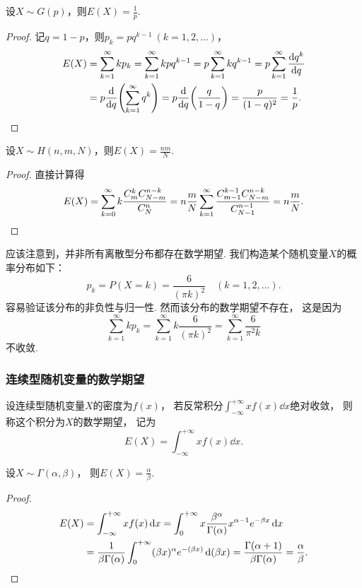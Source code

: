 \begin{theorem}\label{theorem:随机变量的数字特征.几何分布的数学期望}
设\(X \sim G(p)\)，则\(E(X) = \frac{1}{p}\).
\begin{proof}
记\(q = 1-p\)，则\(p_k = pq^{k-1}\ (k=1,2,\dotsc)\)，
\begin{align*}
	E(X)
	&= \sum\limits_{k=1}^\infty k p_k
	= \sum\limits_{k=1}^\infty k p q^{k-1}
	= p \sum\limits_{k=1}^\infty k q^{k-1}
	= p \sum\limits_{k=1}^\infty \dv{q^k}{q} \\
	&= p \dv{q}(\sum\limits_{k=1}^\infty q^k)
	= p \dv{q}(\frac{q}{1-q})
	= \frac{p}{(1-q)^2}
	= \frac{1}{p}.
	\qedhere
\end{align*}
\end{proof}
\end{theorem}

\begin{theorem}
设\(X \sim H(n,m,N)\)，则\(E(X) = \frac{n m}{N}\).
\begin{proof}
直接计算得\[
	E(X)
	= \sum\limits_{k=0}^\infty
		k \frac{C_m^k C_{N-m}^{n-k}}{C_N^n}
	= n \frac{m}{N}
		\sum\limits_{k=1}^\infty
			\frac{C_{m-1}^{k-1} C_{N-m}^{n-k}}{C_{N-1}^{n-1}}
	= n \frac{m}{N}.
	\qedhere
\]
\end{proof}
\end{theorem}

应该注意到，并非所有离散型分布都存在数学期望.
我们构造某个随机变量\(X\)的概率分布如下：\[
	p_k = P(X=k) = \frac{6}{(\pi k)^2}
	\quad(k=1,2,\dotsc).
\]
容易验证该分布的非负性与归一性.
然而该分布的数学期望不存在，
这是因为\[
	\sum\limits_{k=1}^\infty k p_k
	= \sum\limits_{k=1}^\infty k \frac{6}{(\pi k)^2}
	= \sum\limits_{k=1}^\infty \frac{6}{\pi^2 k}
\]不收敛.

\subsubsection{连续型随机变量的数学期望}
\begin{definition}
设连续型随机变量\(X\)的密度为\(f(x)\)，
若反常积分\(\int_{-\infty}^{+\infty} x f(x) \dd{x}\)绝对收敛，
则称这个积分为\(X\)的数学期望，
记为\[
	E(X) = \int_{-\infty}^{+\infty} x f(x) \dd{x}.
\]
\end{definition}

\begin{theorem}\label{theorem:随机变量的数字特征.伽马分布的数学期望}
设\(X \sim \Gamma(\alpha,\beta)\)，
则\(E(X)=\frac{\alpha}{\beta}\).
\begin{proof}
\begin{align*}
E(X)
&= \int_{-\infty}^{+\infty} x f(x) \dd{x}
= \int_0^{+\infty} x \frac{\beta^\alpha}{\Gamma(\alpha)} x^{\alpha-1} e^{-\beta x} \dd{x} \\
&= \frac{1}{\beta \Gamma(\alpha)} \int_0^{+\infty} (\beta x)^\alpha e^{-(\beta x)} \dd(\beta x)
= \frac{\Gamma(\alpha + 1)}{\beta \Gamma(\alpha)}
= \frac{\alpha}{\beta}.
\qedhere
\end{align*}
\end{proof}
\end{theorem}


